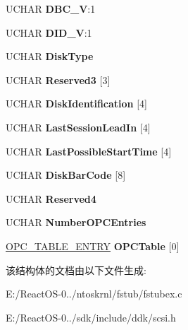 \begin{DoxyCompactItemize}
U\+C\+H\+AR {\bfseries D\+B\+C\+\_\+V}\+:1
\item 
\mbox{\label{struct___d_i_s_k___i_n_f_o_r_m_a_t_i_o_n_ab357ab1cccc9b6a3223bf8c1f6b91564}} 
U\+C\+H\+AR {\bfseries D\+I\+D\+\_\+V}\+:1
\item 
\mbox{\label{struct___d_i_s_k___i_n_f_o_r_m_a_t_i_o_n_ada6808346dfa0c8b975da1e9f09ea57b}} 
U\+C\+H\+AR {\bfseries Disk\+Type}
\item 
\mbox{\label{struct___d_i_s_k___i_n_f_o_r_m_a_t_i_o_n_a3d108328294fd1eeb538ac1fa5645109}} 
U\+C\+H\+AR {\bfseries Reserved3} \mbox{[}3\mbox{]}
\item 
\mbox{\label{struct___d_i_s_k___i_n_f_o_r_m_a_t_i_o_n_a7a5e3866ac87db1e69fb7733b16d2622}} 
U\+C\+H\+AR {\bfseries Disk\+Identification} \mbox{[}4\mbox{]}
\item 
\mbox{\label{struct___d_i_s_k___i_n_f_o_r_m_a_t_i_o_n_a97d277785060284fe108b20e82574146}} 
U\+C\+H\+AR {\bfseries Last\+Session\+Lead\+In} \mbox{[}4\mbox{]}
\item 
\mbox{\label{struct___d_i_s_k___i_n_f_o_r_m_a_t_i_o_n_a02a53341b17b96a4df8ea3cfec5ce859}} 
U\+C\+H\+AR {\bfseries Last\+Possible\+Start\+Time} \mbox{[}4\mbox{]}
\item 
\mbox{\label{struct___d_i_s_k___i_n_f_o_r_m_a_t_i_o_n_a4ab60b44fe976e4d616d68f5027d216b}} 
U\+C\+H\+AR {\bfseries Disk\+Bar\+Code} \mbox{[}8\mbox{]}
\item 
\mbox{\label{struct___d_i_s_k___i_n_f_o_r_m_a_t_i_o_n_a52efbb6285e4c9a5fef97dbfa92c9426}} 
U\+C\+H\+AR {\bfseries Reserved4}
\item 
\mbox{\label{struct___d_i_s_k___i_n_f_o_r_m_a_t_i_o_n_a348da7b69274191b04ed34cf4c3950cf}} 
U\+C\+H\+AR {\bfseries Number\+O\+P\+C\+Entries}
\item 
\mbox{\label{struct___d_i_s_k___i_n_f_o_r_m_a_t_i_o_n_adb0c7e261f5862ed5fa03c1d019630d6}} 
\hyperlink{struct___o_p_c___t_a_b_l_e___e_n_t_r_y}{O\+P\+C\+\_\+\+T\+A\+B\+L\+E\+\_\+\+E\+N\+T\+RY} {\bfseries O\+P\+C\+Table} \mbox{[}0\mbox{]}
\end{DoxyCompactItemize}


该结构体的文档由以下文件生成\+:\begin{DoxyCompactItemize}
\item 
E\+:/\+React\+O\+S-\/0../ntoskrnl/fstub/fstubex.\+c\item 
E\+:/\+React\+O\+S-\/0../sdk/include/ddk/scsi.\+h\end{DoxyCompactItemize}
